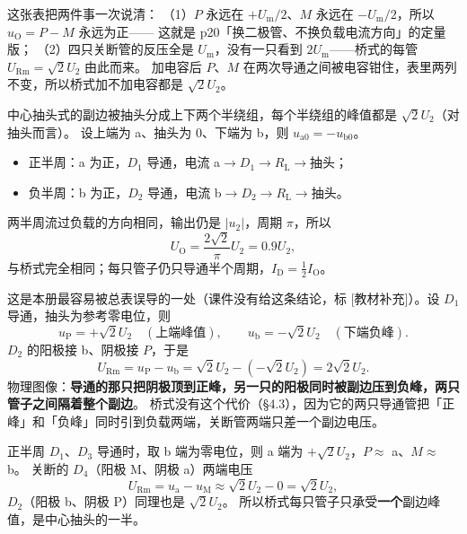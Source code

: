 \documentclass[11pt]{ctexart}
\begin{document}
这张表把两件事一次说清：
（1）$P$ 永远在 $+U_{\mathrm{m}}/2$、$M$ 永远在 $-U_{\mathrm{m}}/2$，所以 $u_{\mathrm{O}}=P-M$ 永远为正——
这就是 p20「换二极管、不换负载电流方向」的定量版；
（2）四只关断管的反压全是 $U_{\mathrm{m}}$，没有一只看到 $2U_{\mathrm{m}}$——桥式的每管 $U_{\mathrm{Rm}}=\sqrt2U_2$ 由此而来。
加电容后 $P$、$M$ 在两次导通之间被电容钳住，表里两列不变，所以桥式加不加电容都是 $\sqrt2U_2$。




中心抽头式的副边被抽头分成上下两个半绕组，每个半绕组的峰值都是 $\sqrt2U_2$（对抽头而言）。
设上端为 a、抽头为 0、下端为 b，则 $u_{\mathrm{a0}}=-u_{\mathrm{b0}}$。
\begin{itemize}
\item 正半周：a 为正，$D_1$ 导通，电流 a$\to D_1\to R_{\mathrm{L}}\to$抽头；
\item 负半周：b 为正，$D_2$ 导通，电流 b$\to D_2\to R_{\mathrm{L}}\to$抽头。
\end{itemize}
两半周流过负载的方向相同，输出仍是 $|u_2|$，周期 $\pi$，所以
\[ U_{\mathrm{O}}=\frac{2\sqrt2}{\pi}U_2=0.9U_2 , \]
与桥式完全相同；每只管子仍只导通半个周期，$I_{\mathrm{D}}=\tfrac12I_{\mathrm{O}}$。


这是本册最容易被总表误导的一处（课件没有给这条结论，标 [教材补充]）。设 $D_1$ 导通，抽头为参考零电位，则
\[ u_{\mathrm{P}}=+\sqrt2U_2\quad(\text{上端峰值}),\qquad
u_{\mathrm{b}}=-\sqrt2U_2\quad(\text{下端负峰}) . \]
$D_2$ 的阳极接 b、阴极接 $P$，于是
\[ U_{\mathrm{Rm}}=u_{\mathrm{P}}-u_{\mathrm{b}}=\sqrt2U_2-(-\sqrt2U_2)=2\sqrt2U_2 . \]
物理图像：\textbf{导通的那只把阴极顶到正峰，另一只的阳极同时被副边压到负峰，两只管子之间隔着整个副边}。
桥式没有这个代价（§4.3），因为它的两只导通管把「正峰」和「负峰」同时引到负载两端，关断管两端只差一个副边电压。


正半周 $D_1$、$D_3$ 导通时，取 b 端为零电位，则 a 端为 $+\sqrt2U_2$，$P\approx$ a、$M\approx$ b。
关断的 $D_4$（阳极 M、阴极 a）两端电压
\[ U_{\mathrm{Rm}}=u_{\mathrm{a}}-u_{\mathrm{M}}\approx\sqrt2U_2-0=\sqrt2U_2 , \]
$D_2$（阳极 b、阴极 P）同理也是 $\sqrt2U_2$。
所以桥式每只管子只承受\textbf{一个}副边峰值，是中心抽头的一半。
\end{document}

